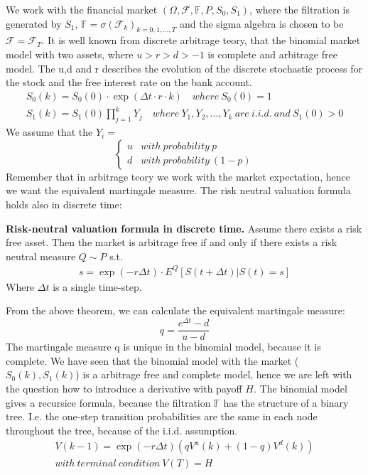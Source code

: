 We work with the financial market $(\Omega, \mathcal{F}, \mathbb{F}, P, S_0, S_1)$, where the filtration is generated by $S_1$, $\mathbb{F}= \sigma(\mathcal{F}_{k})_{k=0,1,\ldots, T}$ and the sigma algebra is chosen to be $\mathcal{F}=\mathcal{F}_{T}$. It is well known from discrete arbitrage teory, that the binomial market model with two assets, where $u>r>d>-1$ is complete and arbitrage free model. The u,d and r describes the evolution of the discrete stochastic process for the stock and the free interest rate on the bank account. 
\begin{align*}
S_{0}(k)=S_{0}(0) \cdot \exp(\Delta t \cdot r \cdot k) \quad where \ S_{0}(0)=1\\
S_{1}(k)=S_{1}(0)\prod_{j=1}^{k} Y_{j} \quad where \ Y_1,Y_2, \ldots, Y_k \ are \ i.i.d. \ and \ S_1(0)>0
\end{align*}
We assume that the $Y_i=$\[ \begin{cases} 
      u & with \ probability \ p \\
      d & with \ probability \ (1-p)
   \end{cases}
\]
Remember that in arbitrage teory we work with the market expectation, hence we want the equivalent martingale measure. The risk neutral valuation formula holds also in discrete time:
\begin{theorem}\label{RNVF-Discrete}
\textbf{Risk-neutral valuation formula in discrete time. }
Assume there exists a risk free asset. Then the market is arbitrage free if and only if there exists a risk neutral measure $Q \sim P$ s.t.
\begin{align}
s= \exp(- r \Delta t) \cdot E^Q[S(t+\Delta t)|S(t)=s] 
\end{align}
Where $\Delta t$ is a single time-step.
\end{theorem}
From the above theorem, we can calculate the equivalent martingale measure:\\
$$q=\frac{e^{\Delta t}-d}{u-d}$$
The martingale measure q is unique in the binomial model, because it is complete. We have seen that the binomial model with the market ($S_0(k), S_1(k)$) is a arbitrage free and complete model, hence we are left with the question how to introduce a derivative with payoff $H$. The binomial model gives a recursice formula, because the filtration $\mathbb{F}$ has the structure of a binary tree. I.e. the one-step transition probabilities are the same in each node throughout the tree, because of the i.i.d. assumption.
\begin{equation}
\begin{split}
V(k-1)=\exp(-r \Delta t) (qV^{u}(k)+(1-q)V^{d}(k))\\
with \ terminal \ condition \ V(T)=H 
\end{split}
\end{equation}
